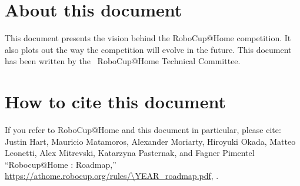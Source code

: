 


\section*{About this document}
This document presents the vision behind the RoboCup@Home competition. It also plots out the way the competition will evolve in the future.
This document has been written by the \YEAR ~RoboCup@Home Technical Committee.

\section*{How to cite this document}
If you refer to RoboCup@Home and this document in particular, please cite:\\

\noindent Justin Hart, Mauricio Matamoros, Alexander Moriarty, Hiroyuki Okada,
Matteo Leonetti, Alex Mitrevski, Katarzyna Pasternak, and Fagner Pimentel
\enquote{Robocup@Home \YEAR: Roadmap,}
\url{https://athome.robocup.org/rules/\YEAR_roadmap.pdf}, \YEAR.

\begin{center}
	\begin{minipage}{0.8\textwidth}
		\footnotesize%
		
	\end{minipage}
\end{center}

